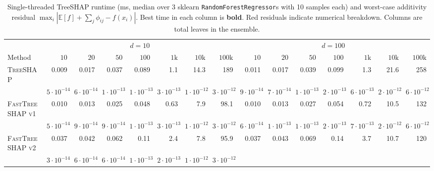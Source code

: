\documentclass{article}
\begin{document}
\begin{table}[t]
\centering
\caption{Single-threaded TreeSHAP runtime (ms, median over 3 sklearn \texttt{RandomForestRegressor}s with 10 samples each) and worst-case additivity residual $\max_i|\mathbb{E}[f] + \sum_j \phi_{ij} - f(x_i)|$. Best time in each column is \textbf{bold}. {\color{red}Red} residuals indicate numerical breakdown. Columns are total leaves in the ensemble.}
\label{tab:treeshap_bench}
\setlength{\tabcolsep}{3pt}
\small
\begin{tabular}{@{}lrrrrrrr@{\hspace{5pt}}rrrrrrr@{}}
\toprule
& \multicolumn{7}{c}{$d = 10$} & \multicolumn{7}{c}{$d = 100$} \\
\cmidrule(lr){2-8}\cmidrule(l){9-15}
Method
  & $10$ & $20$ & $50$ & $100$ & $1\text{k}$ & $10\text{k}$ & $100\text{k}$
  & $10$ & $20$ & $50$ & $100$ & $1\text{k}$ & $10\text{k}$ & $100\text{k}$ \\
\midrule
\textsc{TreeSHAP}
  & 0.009 & 0.017 & 0.037 & 0.089 & 1.1 & 14.3 & 189
  & 0.011 & 0.017 & 0.039 & 0.099 & 1.3 & 21.6 & 258 \\
  & {\scriptsize $5{\cdot}10^{-14}$} & {\scriptsize $6{\cdot}10^{-14}$} & {\scriptsize $1{\cdot}10^{-13}$} & {\scriptsize $1{\cdot}10^{-13}$} & {\scriptsize $3{\cdot}10^{-13}$} & {\scriptsize $1{\cdot}10^{-12}$} & {\scriptsize $3{\cdot}10^{-12}$}
  & {\scriptsize $9{\cdot}10^{-14}$} & {\scriptsize $7{\cdot}10^{-14}$} & {\scriptsize $1{\cdot}10^{-13}$} & {\scriptsize $2{\cdot}10^{-13}$} & {\scriptsize $6{\cdot}10^{-13}$} & {\scriptsize $2{\cdot}10^{-12}$} & {\scriptsize $6{\cdot}10^{-12}$} \\[2pt]
\textsc{FastTreeSHAP v1}
  & 0.010 & 0.013 & 0.025 & 0.048 & 0.63 & 7.9 & 98.1
  & 0.010 & 0.013 & 0.027 & 0.054 & 0.72 & 10.5 & 132 \\
  & {\scriptsize $5{\cdot}10^{-14}$} & {\scriptsize $9{\cdot}10^{-14}$} & {\scriptsize $9{\cdot}10^{-14}$} & {\scriptsize $1{\cdot}10^{-13}$} & {\scriptsize $3{\cdot}10^{-13}$} & {\scriptsize $1{\cdot}10^{-12}$} & {\scriptsize $3{\cdot}10^{-12}$}
  & {\scriptsize $6{\cdot}10^{-14}$} & {\scriptsize $1{\cdot}10^{-13}$} & {\scriptsize $1{\cdot}10^{-13}$} & {\scriptsize $2{\cdot}10^{-13}$} & {\scriptsize $7{\cdot}10^{-13}$} & {\scriptsize $2{\cdot}10^{-12}$} & {\scriptsize $6{\cdot}10^{-12}$} \\[2pt]
\textsc{FastTreeSHAP v2}
  & 0.037 & 0.042 & 0.062 & 0.11 & 2.4 & 7.8 & 95.9
  & 0.037 & 0.043 & 0.069 & 0.14 & 3.7 & 10.7 & 120 \\
  & {\scriptsize $3{\cdot}10^{-14}$} & {\scriptsize $6{\cdot}10^{-14}$} & {\scriptsize $6{\cdot}10^{-14}$} & {\scriptsize $1{\cdot}10^{-13}$} & {\scriptsize $2{\cdot}10^{-13}$} & {\scriptsize $1{\cdot}10^{-12}$} & {\scriptsize $3{\cdot}10^{-12}$}

\end{tabular}
\end{table}
\end{document}
